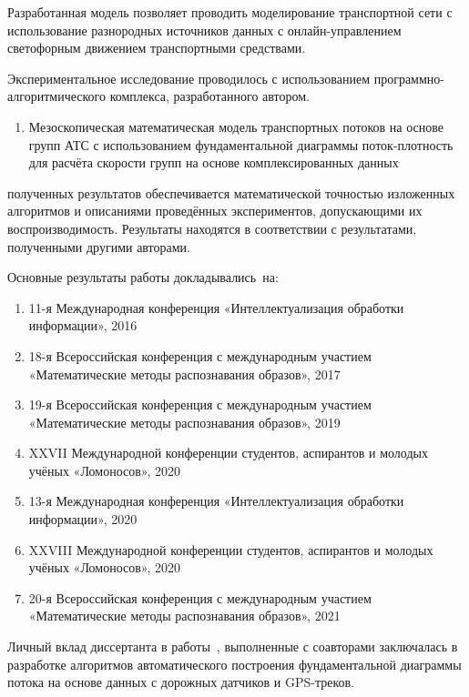 {\influence} Разработанная модель позволяет проводить моделирование транспортной сети с использование разнородных источников данных с онлайн-управлением светофорным движением транспортными средствами.

{\methods} Экспериментальное исследование проводилось с использованием программно-алгоритмического комплекса, разработанного автором.

{}
\begin{enumerate}[beginpenalty=10000] %
  \item Мезоскопическая математическая модель транспортных потоков на основе групп АТС с использованием фундаментальной диаграммы поток-плотность для расчёта скорости групп на основе комплексированных данных
\end{enumerate}


{\reliability} полученных результатов обеспечивается математической точностью изложенных алгоритмов и описаниями проведённых экспериментов, допускающими их воспроизводимость.
Результаты находятся в соответствии с результатами, полученными другими авторами.


{\probation}
Основные результаты работы докладывались~на:
\begin{enumerate}
  \item 11-я Международная конференция «Интеллектуализация обработки информации», 2016
  \item 18-я Всероссийская конференция с международным участием «Математические методы распознавания образов», 2017
  \item 19-я Всероссийская конференция с международным участием «Математические методы распознавания образов», 2019
  \item XXVII Международной конференции студентов, аспирантов и молодых учёных «Ломоносов», 2020
  \item 13-я Международная конференция «Интеллектуализация обработки информации», 2020
  \item XXVIII Международной конференции студентов, аспирантов и молодых учёных «Ломоносов», 2020
  \item 20-я Всероссийская конференция с международным участием «Математические методы распознавания образов», 2021
\end{enumerate}

{\contribution} Личный вклад диссертанта в работы~\autocite{collectiveArticle2, collectiveArticle}, выполненные с соавторами заключалась в разработке алгоритмов автоматического построения фундаментальной диаграммы потока на основе данных с дорожных датчиков и GPS-треков.

